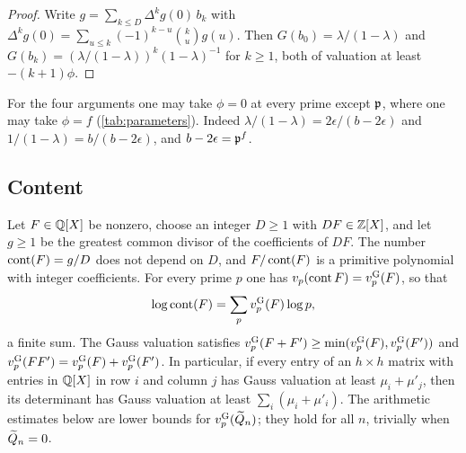 \begin{proof}
Write $g=\sum_{k\le D}\Delta^kg(0)\,b_k$ with $\Delta^kg(0)=\sum_{u\le k}(-1)^{k-u}\binom ku g(u)$. Then $G(b_0)=\lambda/(1-\lambda)$ and $G(b_k)=(\lambda/(1-\lambda))^k(1-\lambda)^{-1}$ for $k\ge1$, both of valuation at least $-(k+1)\phi$.
\end{proof}

For the four arguments one may take $\phi=0$ at every prime except $\mathfrak{p}$, where one may take $\phi=f$ (\cref{tab:parameters}). Indeed $\lambda/(1-\lambda)=2\epsilon/(b-2\epsilon)$ and $1/(1-\lambda)=b/(b-2\epsilon)$, and $b-2\epsilon=\mathfrak{p}^f$.

\subsection{Content}\label{sec:content}
Let $F\in\mathbb{Q}[X]$ be nonzero, choose an integer $D\ge1$ with $DF\in\mathbb{Z}[X]$, and let $g\ge1$ be the greatest common divisor of the coefficients of $DF$. The number $\operatorname{cont}(F)=g/D$ does not depend on $D$, and $F/\operatorname{cont}(F)$ is a primitive polynomial with integer coefficients. For every prime $p$ one has $v_p(\operatorname{cont} F)=v^{\mathrm{G}}_{p}(F)$, so that
\begin{equation}\label{eq:content-sum}
\log\operatorname{cont}(F)=\sum_pv^{\mathrm{G}}_{p}(F)\log p ,
\end{equation}
a finite sum. The Gauss valuation satisfies $v^{\mathrm{G}}_{p}(F+F')\ge\min(v^{\mathrm{G}}_{p}(F),v^{\mathrm{G}}_{p}(F'))$ and $v^{\mathrm{G}}_{p}(FF')=v^{\mathrm{G}}_{p}(F)+v^{\mathrm{G}}_{p}(F')$. In particular, if every entry of an $h\times h$ matrix with entries in $\mathbb{Q}[X]$ in row $i$ and column $j$ has Gauss valuation at least $\mu_i+\mu'_j$, then its determinant has Gauss valuation at least $\sum_i(\mu_i+\mu'_i)$. The arithmetic estimates below are lower bounds for $v^{\mathrm{G}}_{p}(\widetilde{Q}_n)$; they hold for all $n$, trivially when $\widetilde{Q}_n=0$.
